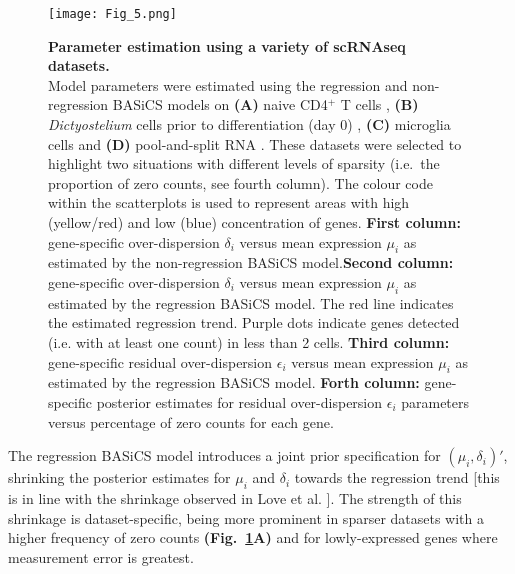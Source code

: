\begin{figure}[!h]
\centering
\texttt{[image: Fig\_5.png]}
\caption{\textbf{Parameter estimation using a variety of scRNAseq datasets.}\\
Model parameters were estimated using the regression and non-regression BASiCS models on \textbf{(A)} naive CD4$^+$ T cells \citep{Martinez-jimenez2017}, \textbf{(B)} \textit{Dictyostelium} cells prior to differentiation (day 0) \citep{Antolovic2017}, \textbf{(C)} microglia cells \citep{Zeisel2015} and \textbf{(D)} pool-and-split RNA \citep{Grun2014}. These datasets were selected to highlight two situations with different levels of sparsity (i.e.~the proportion of zero counts, see fourth column). The colour code within the scatterplots is used to represent areas with high (yellow/red) and low (blue) concentration of genes. \textbf{First column:} gene-specific over-dispersion $\delta_i$ versus mean expression $\mu_i$ as estimated by the non-regression BASiCS model.\textbf{Second column:} gene-specific over-dispersion $\delta_i$ versus mean expression $\mu_i$ as estimated by the regression BASiCS model. The red line indicates the estimated regression trend. Purple dots indicate genes detected (i.e. with at least one count) in less than 2 cells. \textbf{Third column:} gene-specific residual over-dispersion $\epsilon_i$ versus mean expression $\mu_i$ as estimated by the regression BASiCS model. \textbf{Forth column:} gene-specific posterior estimates for residual over-dispersion $\epsilon_i$ parameters versus percentage of zero counts for each gene.\\}
\label{fig2:datasets}
\end{figure}

\newpage

The regression BASiCS model introduces a joint prior specification for $(\mu_i, \delta_i)'$, shrinking the posterior estimates for $\mu_i$ and $\delta_i$ towards the regression trend [this is in line with the shrinkage observed in Love et al. \citep{Love2014a}]. The strength of this shrinkage is dataset-specific, being more prominent in sparser datasets with a higher frequency of zero counts \textbf{(Fig.~\ref{fig2:datasets}A)} and for lowly-expressed genes where measurement error is greatest. \\

